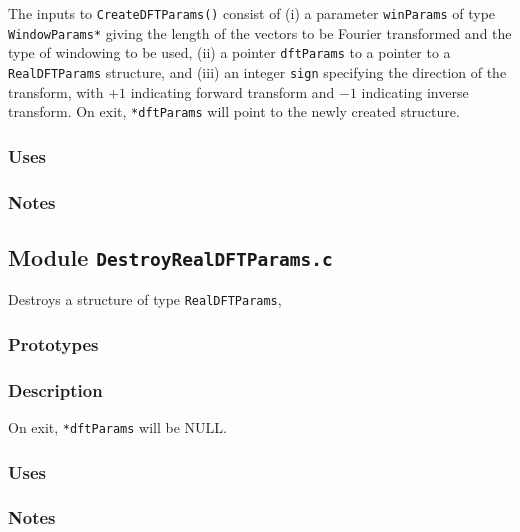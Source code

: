 The inputs to \verb+CreateDFTParams()+ consist of (i) a parameter
\verb+winParams+ of type \verb+WindowParams*+ giving the length of the vectors
to be Fourier  transformed and the type of windowing to be used, (ii) a
pointer \verb+dftParams+ to a pointer to a \verb+RealDFTParams+ structure, and
(iii) an integer \verb+sign+ specifying the direction of the transform, with
$+1$ indicating forward transform and $-1$ indicating inverse transform.  On
exit, \verb+*dftParams+ will point to the newly created structure.

\subsubsection*{Uses}

\subsubsection*{Notes}

\vfill{\footnotesize}

\newpage
\subsection{Module \texttt{DestroyRealDFTParams.c}}
\label{ss:DestroyRealDFTParams.c}

Destroys a structure of type \verb+RealDFTParams+,

\subsubsection*{Prototypes}
\vspace{0.1in}


\subsubsection*{Description}

On exit, \verb+*dftParams+ will be NULL.

\subsubsection*{Uses}

\subsubsection*{Notes}

